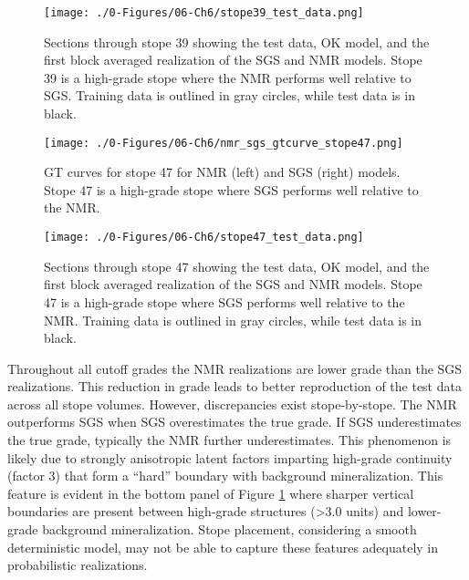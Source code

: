 \begin{figure}[htb!]
    \centering
    \texttt{[image: ./0-Figures/06-Ch6/stope39\_test\_data.png]}
    \caption{Sections through stope 39 showing the test data, \gls{OK} model, and the first block averaged realization of the \gls{SGS} and \gls{NMR} models. Stope 39 is a high-grade stope where the \gls{NMR} performs well relative to \gls{SGS}. Training data is outlined in gray circles, while test data is in black.}
    \label{fig:stope39_test_data}
\end{figure}

\begin{figure}[htb!]
    \centering
    \texttt{[image: ./0-Figures/06-Ch6/nmr\_sgs\_gtcurve\_stope47.png]}
    \caption{\Gls{GT} curves for stope 47 for \gls{NMR} (left) and \gls{SGS} (right) models. Stope 47 is a high-grade stope where \gls{SGS} performs well relative to the \gls{NMR}.}
    \label{fig:nmr_sgs_gtcurve_stope47}
\end{figure}

\begin{figure}[htb!]
    \centering
    \texttt{[image: ./0-Figures/06-Ch6/stope47\_test\_data.png]}
    \caption{Sections through stope 47 showing the test data, \gls{OK} model, and the first block averaged realization of the \gls{SGS} and \gls{NMR} models. Stope 47 is a high-grade stope where \gls{SGS} performs well relative to the \gls{NMR}. Training data is outlined in gray circles, while test data is in black. }
    \label{fig:stope47_test_data}
\end{figure}

Throughout all cutoff grades the \gls{NMR} realizations are lower grade than the \gls{SGS} realizations. This reduction in grade leads to better reproduction of the test data across all stope volumes. However, discrepancies exist stope-by-stope. The \gls{NMR} outperforms \gls{SGS} when \gls{SGS} overestimates the true grade. If \gls{SGS} underestimates the true grade, typically the \gls{NMR} further underestimates. This phenomenon is likely due to strongly anisotropic latent factors imparting high-grade continuity (factor 3) that form a ``hard'' boundary with background mineralization. This feature is evident in the bottom panel of Figure \ref{fig:stope39_test_data} where sharper vertical boundaries are present between high-grade structures (>3.0 units) and lower-grade background mineralization. Stope placement, considering a smooth deterministic model, may not be able to capture these features adequately in probabilistic realizations.

